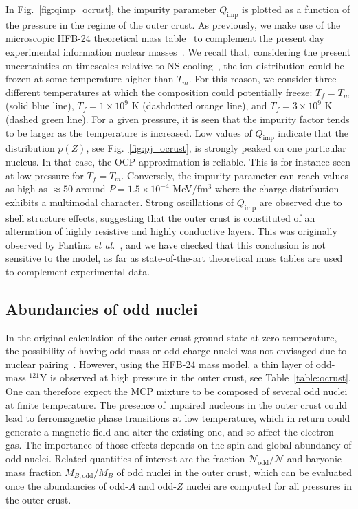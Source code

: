 In Fig.~\ref{fig:qimp_ocrust}, the impurity parameter $Q_{\text{imp}}$ is 
plotted as a function of the pressure in the regime of the outer crust. As
previously, we make use of the microscopic HFB-24 theoretical mass
table~\cite{Goriely2013} to complement the present day experimental
information nuclear masses~\cite{Huang2017,Welker2017}.
We recall that, considering the present uncertainties on timescales relative to 
NS cooling~\cite{Goriely2011}, the ion distribution could be frozen at some
temperature higher than $T_m$.
For this reason, we consider three different temperatures at which the 
composition could potentially freeze: $T_f = T_m$ (solid blue line), 
$T_f = 1\times 10^9$ K (dashdotted orange line), and $T_f = 3\times 10^9$ K 
(dashed green line).
For a given pressure, it is seen that the impurity factor tends to be larger as 
the temperature is increased.
Low values of $Q_{\text{imp}}$ indicate that the distribution $p(Z)$, see
Fig.~\ref{fig:pj_ocrust}, is strongly peaked on one particular nucleus. In that 
case, the OCP approximation is reliable. This is for instance
seen at low pressure for $T_f = T_m$. Conversely, the impurity parameter 
can reach values as high as $\approx 50$ around $P=1.5\times 10^{-4}$ 
MeV/fm$^3$ where the charge distribution exhibits a multimodal 
character. 
Strong oscillations of $Q_{\text{imp}}$ are observed due to shell structure
effects, suggesting that the outer crust is constituted of an alternation of 
highly resistive and highly conductive layers. This was originally observed
by Fantina \textit{et al.}~\cite{Fantina2020}, and we have checked 
that this conclusion is not sensitive to the model, as far as state-of-the-art
theoretical mass tables are used to complement experimental data.

\subsection{Abundancies of odd nuclei}\label{subsec:odd_ocrust}

In the original calculation of the outer-crust ground state at zero 
temperature, the possibility of having odd-mass or odd-charge nuclei was not 
envisaged due to nuclear pairing~\cite{BPS}.
However, using the HFB-24 mass model, a thin layer of odd-mass $^{121}$Y is 
observed at high pressure in the outer crust, see Table~\ref{table:ocrust}.
One can therefore expect the MCP mixture to be composed of several odd nuclei
at finite temperature.
%
The presence of unpaired nucleons in the outer crust could lead to
ferromagnetic phase transitions at low temperature, which in return could 
generate a magnetic field and alter the existing one, and so affect the 
electron gas. The importance of those effects depends on the spin and global
abundancy of odd nuclei.
%
Related quantities of interest are the fraction 
$\mathcal{N}_{\text{odd}}/\mathcal{N}$ and baryonic mass fraction 
$M_{B,\text{odd}}/M_B$ of odd nuclei in the outer crust, which can be evaluated 
once the abundancies of odd-$A$ and odd-$Z$ nuclei are computed for all 
pressures in the outer crust.
 
